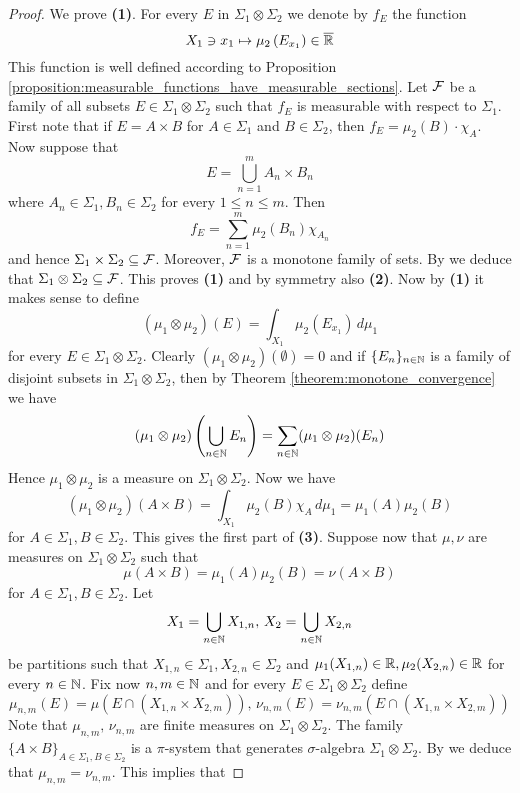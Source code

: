 \begin{proof}
We prove \textbf{(1)}. For every $E$ in $\Sigma_1\otimes \Sigma_2$ we denote by $f_E$ the function
$$X_1\ni x_1 \mapsto \mu_2\left(E_{x_1}\right)\in \overline{{\mathbb R}}$$
This function is well defined according to Proposition \ref{proposition:measurable_functions_have_measurable_sections}. Let ${\mathcal F}$ be a family of all subsets $E\in \Sigma_1\otimes \Sigma_2$ such that $f_E$ is measurable with respect to $\Sigma_1$. First note that if $E=A\times B$ for $A\in \Sigma_1$ and $B\in \Sigma_2$, then  $f_E = \mu_2(B)\cdot \chi_A$. Now suppose that
$$E= \bigcup_{n=1}^mA_n\times B_n$$
where $A_n\in \Sigma_1,B_n\in \Sigma_2$ for every $1\leq n\leq m$. Then
$$f_E = \sum_{n=1}^m\mu_2(B_n)\chi_{A_n}$$
and hence $\Sigma_1\times \Sigma_2\subseteq {\mathcal F}$. Moreover, ${\mathcal F}$ is a monotone family of sets. By {\cite[Theorem 1.5]{Introduction_to_measure_theory}} we deduce that $\Sigma_1\otimes \Sigma_2\subseteq {\mathcal F}$. This proves \textbf{(1)} and by symmetry also \textbf{(2)}. Now by \textbf{(1)} it makes sense to define
$$(\mu_1\otimes \mu_2)(E) = \int_{X_1}\mu_2(E_{x_1})\,d\mu_1$$
for every $E\in \Sigma_1\otimes \Sigma_2$. Clearly $(\mu_1\otimes \mu_2)(\emptyset) = 0$ and if $\{E_n\}_{n\in {\mathbb N}}$ is a family of disjoint subsets in $\Sigma_1\otimes \Sigma_2$, then by Theorem \ref{theorem:monotone_convergence} we have
$$(\mu_1\otimes \mu_2)\left(\bigcup_{n\in {\mathbb N}}E_n\right) = \sum_{n\in {\mathbb N}}(\mu_1\otimes \mu_2)(E_n)$$
Hence $\mu_1\otimes \mu_2$ is a measure on $\Sigma_1\otimes \Sigma_2$. Now we have
$$(\mu_1\otimes \mu_2)\left(A\times B\right) = \int_{X_1}\mu_2(B)\chi_A\,d\mu_1 = \mu_1(A)\mu_2(B)$$
for $A\in \Sigma_1, B\in \Sigma_2$. This gives the first part of \textbf{(3)}. Suppose now that $\mu,\nu$ are measures on $\Sigma_1\otimes \Sigma_2$ such that
$$\mu(A\times B) = \mu_1(A)\mu_2(B) = \nu(A\times B)$$
for $A\in \Sigma_1,B\in \Sigma_2$. Let 
$$X_1 = \bigcup_{n\in {\mathbb N}}X_{1,n},\,X_2 = \bigcup_{n\in {\mathbb N}}X_{2,n}$$
be partitions such that $X_{1,n}\in \Sigma_1,X_{2,n}\in \Sigma_2$ and $\mu_1(X_{1,n})\in {\mathbb R},\mu_2(X_{2,n})\in {\mathbb R}$ for every $n\in {\mathbb N}$. Fix now $n,m\in {\mathbb N}$ and for every $E\in \Sigma_1\otimes \Sigma_2$ define
$$\mu_{n,m}(E) = \mu\left(E\cap (X_{1,n}\times  X_{2,m})\right),\,\nu_{n,m}(E) = \nu_{n,m}\left(E\cap (X_{1,n}\times X_{2,m})\right)$$
Note that $\mu_{n,m},\,\nu_{n,m}$ are finite measures on $\Sigma_1\otimes \Sigma_2$. The family $\big\{A\times B\big\}_{A\in \Sigma_1,B\in \Sigma_2}$ is a $\pi$-system that generates $\sigma$-algebra $\Sigma_1\otimes \Sigma_2$. By {\cite[Theorem 2.6]{Introduction_to_measure_theory}} we deduce that $\mu_{n,m} = \nu_{n,m}$. This implies that

\end{proof}
